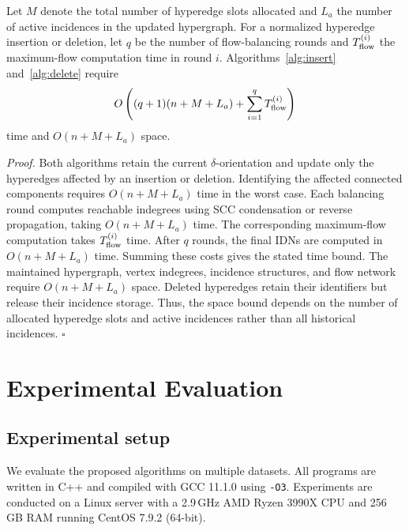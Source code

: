 \documentclass[twocolumn]{svjour3}
\begin{document}
\begin{theorem}
\label{thm:dynamic-complexity}
Let $M$ denote the total number of hyperedge slots allocated
and $L_a$ the number of active incidences in the updated
hypergraph. For a normalized hyperedge insertion or deletion,
let $q$ be the number of flow-balancing rounds and
$T_{\rm flow}^{(i)}$ the maximum-flow computation time
in round $i$. Algorithms~\ref{alg:insert} and~\ref{alg:delete}
require
\[
O\left(
(q+1)(n+M+L_a)
+\sum_{i=1}^{q}T_{\rm flow}^{(i)}
\right)
\]
time and $O(n+M+L_a)$ space.
\end{theorem}

\emph{Proof.}
Both algorithms retain the current $\delta$-orientation and
update only the hyperedges affected by an insertion or deletion.
Identifying the affected connected components requires
$O(n+M+L_a)$ time in the worst case.
Each balancing round computes reachable indegrees using
SCC condensation or reverse propagation, taking
$O(n+M+L_a)$ time. The corresponding maximum-flow
computation takes $T_{\rm flow}^{(i)}$ time.
After $q$ rounds, the final IDNs are computed in
$O(n+M+L_a)$ time. Summing these costs gives the
stated time bound.
The maintained hypergraph, vertex indegrees, incidence
structures, and flow network require $O(n+M+L_a)$ space.
Deleted hyperedges retain their identifiers but release
their incidence storage. Thus, the space bound depends
on the number of allocated hyperedge slots and active
incidences rather than all historical incidences.
\hfill$\square$




\section{Experimental Evaluation}
\label{sec:reproduced}
\subsection{Experimental setup}

We evaluate the proposed algorithms on multiple datasets. All programs are written in C++ and compiled with GCC 11.1.0 using \texttt{-O3}. Experiments are conducted on a Linux server with a 2.9\,GHz AMD Ryzen 3990X CPU and 256\,GB RAM running CentOS 7.9.2 (64-bit).
\end{document}

